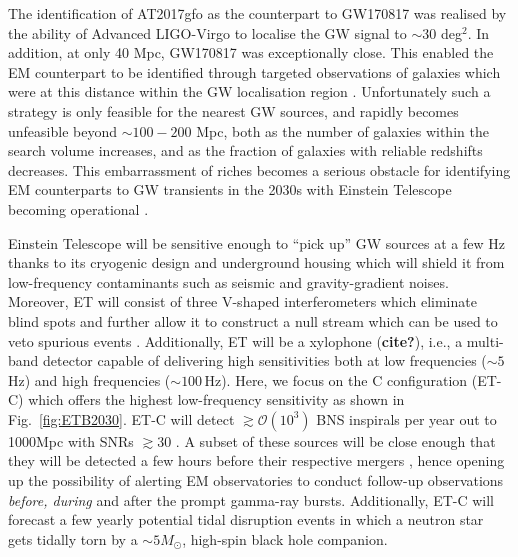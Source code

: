 \documentclass{aa}
\begin{document}
The identification of AT2017gfo as the counterpart to GW170817 was realised by the 
ability of Advanced LIGO-Virgo to localise the GW signal to $\sim$30 deg$^2$.
In addition, at only 40 Mpc, GW170817 was exceptionally close. This enabled the EM counterpart to be identified through targeted observations of galaxies which were at this distance within the GW localisation region \citep{Coul17}. Unfortunately such a strategy is only feasible for the nearest GW sources, and rapidly becomes unfeasible beyond $\sim100-200$ Mpc, both as the number of galaxies within the search volume increases, and as the fraction of galaxies with reliable redshifts decreases. 
This embarrassment of riches becomes a serious obstacle for identifying EM counterparts to GW transients in the 2030s with Einstein Telescope becoming operational \citep{ET_doc}.

Einstein Telescope will be sensitive enough to ``pick up'' GW sources at a few Hz thanks to
its cryogenic design and underground housing which will shield it from low-frequency contaminants such as seismic and gravity-gradient noises. Moreover, ET will consist of three
 V-shaped interferometers which eliminate blind spots and further allow it to construct a null
 stream \citep{Sathyaprakash:2012jk} which can be used to veto spurious events \citep{Wen:2005ui}. 
 Additionally, ET will be a xylophone ({\bf cite?}), i.e., a multi-band detector capable of delivering high sensitivities both at low frequencies ($\sim 5\,$Hz) and high frequencies ($\sim 100\,$Hz). 
 Here, we focus on the C configuration (ET-C) which offers the highest low-frequency sensitivity as shown in Fig.~\ref{fig:ETB2030}.
 ET-C will detect $\gtrsim\mathcal{O}(10^3)$ BNS inspirals per year out to 1000Mpc with SNRs $\gtrsim 30 $ \citep{Akcay18}. A subset of these sources will be close enough that they will be detected a few hours
before their respective mergers \citep{Akcay18}, hence opening up the possibility of alerting EM
observatories to conduct follow-up observations \emph{before, during} and after the prompt gamma-ray bursts. Additionally, ET-C will forecast a few yearly potential tidal disruption events in which
a neutron star gets tidally torn by a $\sim 5 M_\odot$, high-spin black hole companion.

\end{document}
